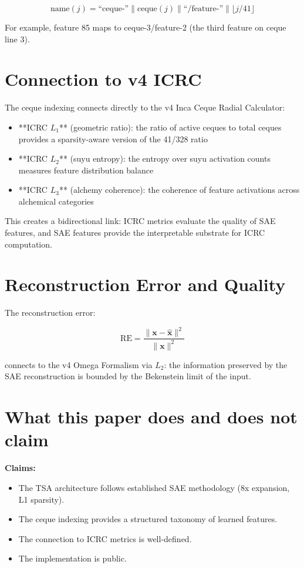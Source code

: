 \documentclass[11pt]{article}
\theoremstyle{plain}
\begin{document}
\begin{equation}
\text{name}(j) = \text{``ceque-''} \| \text{ceque}(j) \| \text{``/feature-''} \| \lfloor j / 41 \rfloor
\end{equation}

For example, feature 85 maps to ceque-3/feature-2 (the third feature on ceque line 3).


\section{Connection to v4 ICRC}

The ceque indexing connects directly to the v4 Inca Ceque Radial Calculator:

\begin{itemize}
  \item **ICRC \( L_1 \)** (geometric ratio): the ratio of active ceques to total ceques provides a sparsity-aware version of the 41/328 ratio
  \item **ICRC \( L_2 \)** (suyu entropy): the entropy over suyu activation counts measures feature distribution balance
  \item **ICRC \( L_3 \)** (alchemy coherence): the coherence of feature activations across alchemical categories
\end{itemize}

This creates a bidirectional link: ICRC metrics evaluate the quality of SAE features, and SAE features provide the interpretable substrate for ICRC computation.


\section{Reconstruction Error and Quality}

The reconstruction error:

\begin{equation}
\text{RE} = \frac{\|\mathbf{x} - \hat{\mathbf{x}}\|^2}{\|\mathbf{x}\|^2}
\end{equation}

connects to the v4 Omega Formalism via \( L_2 \): the information preserved by the SAE reconstruction is bounded by the Bekenstein limit of the input.


\section{What this paper does and does not claim}

\textbf{Claims:}
\begin{itemize}
  \item The TSA architecture follows established SAE methodology (8x expansion, L1 sparsity).
  \item The ceque indexing provides a structured taxonomy of learned features.
  \item The connection to ICRC metrics is well-defined.
  \item The implementation is public.
\end{itemize}
\end{document}
